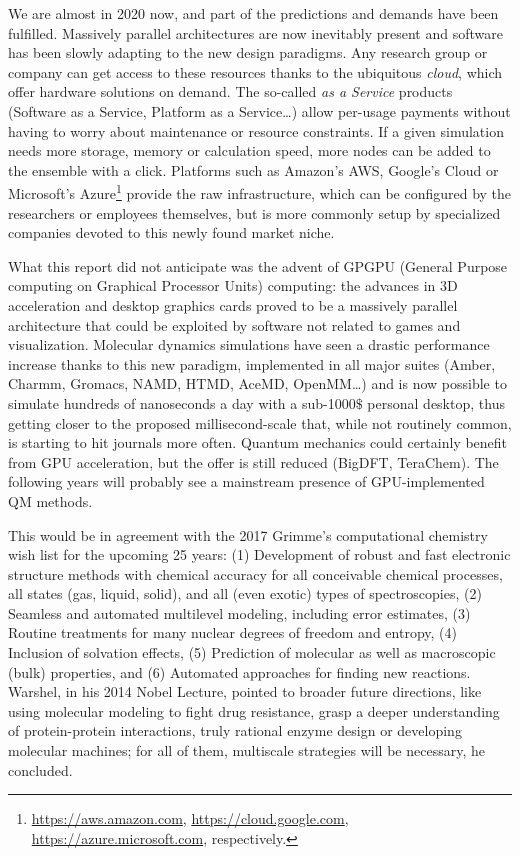 We are almost in 2020 now, and part of the predictions and demands have been fulfilled. Massively parallel architectures are now inevitably present and software has been slowly adapting to the new design paradigms. Any research group or company can get access to these resources thanks to the ubiquitous \textit{cloud}, which offer hardware solutions on demand. The so-called \textit{as a Service}  products (Software as a Service, Platform as a Service\ldots) allow per-usage payments without having to worry about maintenance or resource constraints. If a given simulation needs more storage, memory or calculation speed, more nodes can be added to the ensemble with a click. Platforms such as Amazon's AWS, Google's Cloud or Microsoft's Azure\footnote{\url{https://aws.amazon.com}, \url{https://cloud.google.com}, \url{https://azure.microsoft.com}, respectively.} provide the raw infrastructure, which can be configured by the researchers or employees themselves, but is more commonly setup by specialized companies devoted to this newly found market niche.

What this report did not anticipate was the advent of GPGPU (General Purpose computing on Graphical Processor Units) computing: the advances in 3D acceleration and desktop graphics cards proved to be a massively parallel architecture that could be exploited by software not related to games and visualization. Molecular dynamics simulations have seen a drastic performance increase thanks to this new paradigm, implemented in all major suites (Amber,\cite{amber} Charmm,\cite{brooks1983} Gromacs,\cite{gromacs} NAMD,\cite{namd} HTMD,\cite{htmd} AceMD,\cite{acemd} OpenMM\cite{openmm}\ldots) and is now possible to simulate hundreds of nanoseconds a day with a sub-1000$\$$  personal desktop, thus getting closer to the proposed millisecond-scale that, while not routinely common, is starting to hit journals more often.\cite{shaw2008anton,lane2013} Quantum mechanics could certainly benefit from GPU acceleration, but the offer is still reduced (BigDFT,\cite{genovese2011daubechies} TeraChem\cite{luehr2011dynamic}). The following years will probably see a mainstream presence of GPU-implemented QM methods.

This would be in agreement with the 2017 Grimme's computational chemistry wish list for the upcoming 25 years: (1) Development of robust and fast electronic structure methods with chemical accuracy for all conceivable chemical processes, all states (gas, liquid, solid), and all (even exotic) types of spectroscopies, (2) Seamless and automated multilevel modeling, including error estimates, (3) Routine treatments for many nuclear degrees of freedom and entropy, (4) Inclusion of solvation effects, (5) Prediction of molecular as well as macroscopic (bulk) properties, and (6) Automated approaches for finding new reactions. Warshel, in his 2014 Nobel Lecture, pointed to broader future directions, like using molecular modeling to fight drug resistance, grasp a deeper understanding of protein-protein interactions, truly rational enzyme design or developing molecular machines; for all of them, multiscale strategies will be necessary, he concluded.\cite{Warshel2014}

